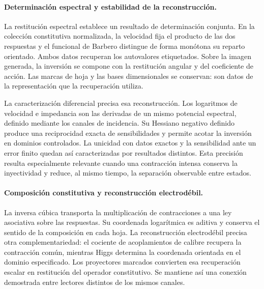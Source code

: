 \paragraph{Determinación espectral y estabilidad de la reconstrucción.}
La restitución espectral establece un resultado de determinación conjunta. En la colección
constitutiva normalizada, la velocidad fija el producto de las dos
respuestas y el funcional de Barbero distingue de forma monótona su reparto
orientado. Ambos datos recuperan los autovalores etiquetados. Sobre la
imagen generada, la inversión se compone con la restitución angular y del
coeficiente de acción. Las marcas de hoja y las bases dimensionales se
conservan: son datos de la representación que la recuperación utiliza.

La caracterización diferencial precisa esa reconstrucción. Los logaritmos de velocidad e
impedancia son las derivadas de un mismo potencial espectral, definido
mediante los canales de incidencia. Su Hessiano negativo definido produce
una reciprocidad exacta de sensibilidades y permite acotar la inversión
en dominios controlados. La unicidad con datos exactos y la sensibilidad
ante un error finito quedan así caracterizadas por resultados distintos.
Esta precisión resulta especialmente relevante cuando una contracción
intensa conserva la inyectividad y reduce, al mismo tiempo, la separación
observable entre estados.

\paragraph{Composición constitutiva y reconstrucción electrodébil.}
La inversa cúbica transporta la multiplicación de contracciones a una
ley asociativa sobre las respuestas. Su coordenada logarítmica es
aditiva y conserva el sentido de la composición en cada hoja. La
reconstrucción electrodébil precisa otra complementariedad: el cociente
de acoplamientos de calibre recupera la contracción común, mientras
Higgs determina la coordenada orientada en el dominio especificado.
Los proyectores marcados convierten esa recuperación escalar en
restitución del operador constitutivo. Se mantiene así una conexión
demostrada entre lectores distintos de los mismos canales.

